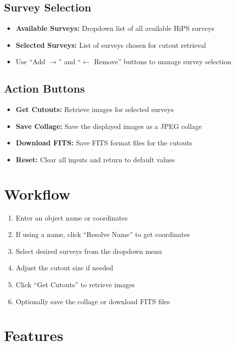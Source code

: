 \documentclass{article}
\begin{document}
\subsection{Survey Selection}
\begin{itemize}
    \item \textbf{Available Surveys:} Dropdown list of all available HiPS surveys
    \item \textbf{Selected Surveys:} List of surveys chosen for cutout retrieval
    \item Use ``Add $\rightarrow$'' and ``$\leftarrow$ Remove'' buttons to manage survey selection
\end{itemize}

\subsection{Action Buttons}
\begin{itemize}
    \item \textbf{Get Cutouts:} Retrieve images for selected surveys
    \item \textbf{Save Collage:} Save the displayed images as a JPEG collage
    \item \textbf{Download FITS:} Save FITS format files for the cutouts
    \item \textbf{Reset:} Clear all inputs and return to default values
\end{itemize}

\section{Workflow}
\begin{enumerate}
    \item Enter an object name or coordinates
    \item If using a name, click ``Resolve Name'' to get coordinates
    \item Select desired surveys from the dropdown menu
    \item Adjust the cutout size if needed
    \item Click ``Get Cutouts'' to retrieve images
    \item Optionally save the collage or download FITS files
\end{enumerate}

\section{Features}
\end{document}
